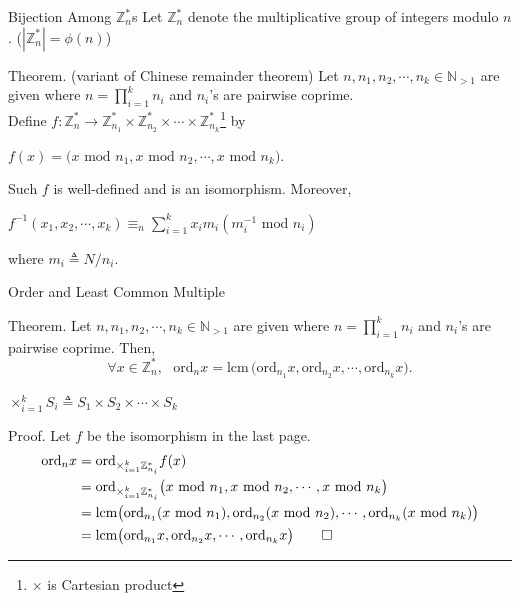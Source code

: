 \documentclass{beamer}
\newcommand{\mbb}[1]{\mathbb{#1}}
\newcommand{\mrm}[1]{\mathrm{#1}}
\renewcommand{\:}{\text{ }}
\renewcommand{\mod}{\text{ mod }}
\newcommand{\ord}[1]{\mrm{ord}_{#1}}
\begin{document}
    \hypertarget{isomorphism}{
    \begin{frame}{Bijection Among $\mbb{Z}_n^\ast$s }
        Let $\mbb{Z}_n^\ast$ denote the multiplicative group of integers modulo $n$. ($|\mbb{Z}_n^\ast| = \phi(n)$)
        \begin{exampleblock}{Theorem. (variant of Chinese remainder theorem)}
            Let $n, n_1, n_2, \cdots, n_k \in \mbb{N}_{>1}$ are given where $n = \prod_{i=1}^k n_i$ and $n_i$'s are pairwise coprime.\\
            Define $f \colon \mbb{Z}_n^\ast \to \mbb{Z}_{n_1}^\ast \times \mbb{Z}_{n_2}^\ast \times \cdots \times \mbb{Z}_{n_k}^\ast$\footnote{$\times$ is Cartesian product} by\\[.4em]
            \centerline{$f(x) = \big( x \mod n_1, x \mod n_2, \cdots, x \mod n_k \big)\text{.}$}\vspace*{.4em}
            Such $f$ is well-defined and is an isomorphism. Moreover,\\[.4em]
            \centerline{$f^{-1}(x_1, x_2, \cdots, x_k) \equiv_n \sum_{i=1}^k x_i m_i \left( m_i^{-1} \mod n_i \right)$}\vspace*{.4em}
            where $m_i \triangleq N / n_i$.
        \end{exampleblock}
    \end{frame}}

    \begin{frame}{Order and Least Common Multiple}
        \begin{exampleblock}{Theorem.}
            Let $n, n_1, n_2, \cdots, n_k \in \mbb{N}_{>1}$ are given where $n = \prod_{i=1}^k n_i$ and $n_i$'s are pairwise coprime. Then,
            \[ \forall x \in \mbb{Z}_{n}^{\ast},\: \ord{n} x = \mrm{lcm}\, \big( \ord{n_1} x, \ord{n_2} x, \cdots, \ord{n_k} x \big)\text{.} \]
        \end{exampleblock}
        \centerline{$\times_{i=1}^k S_i \triangleq S_1 \times S_2 \times \cdots \times S_k$}
        \begin{exampleblock}{Proof.}
            \small Let $f$ be the isomorphism in the last page.
            \begin{align*}
                \ord{n} x &= \ord{\times_{i=1}^k \mbb{Z}_{n_i}^\ast} f(x) \\
                &= \ord{\times_{i=1}^k \mbb{Z}_{n_i}^\ast} \big( x \mod n_1, x \mod n_2, \cdots, x \mod n_k \big) \\
                &= \mrm{lcm} \big( \ord{n_1}(x \mod n_1), \ord{n_2}(x \mod n_2), \cdots, \ord{n_k}(x \mod n_k) \big) \\
                &= \mrm{lcm} \big( \ord{n_1}x, \ord{n_2}x, \cdots, \ord{n_k}x \big) \hfill \qed
            \end{align*}
        \end{exampleblock}
    \end{frame}
\end{document}
